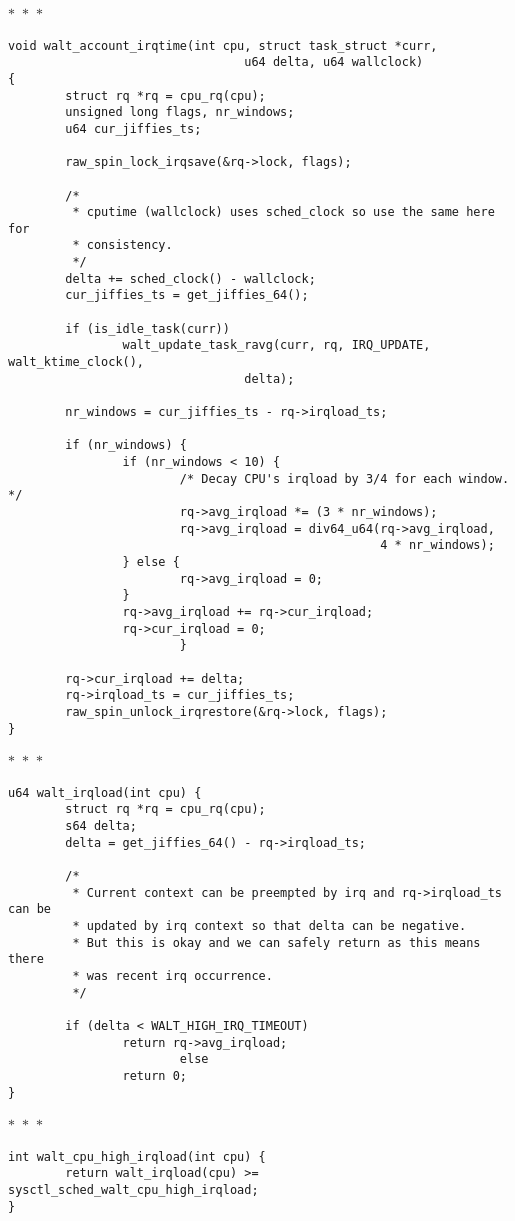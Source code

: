 \documentclass{article}
\newcommand{\divider}{{\begin{center}
  $\ast$~$\ast$~$\ast$
\end{center}}}
\begin{document}
\divider
\begin{verbatim}
void walt_account_irqtime(int cpu, struct task_struct *curr,
                                 u64 delta, u64 wallclock)
{
        struct rq *rq = cpu_rq(cpu);
        unsigned long flags, nr_windows;
        u64 cur_jiffies_ts;

        raw_spin_lock_irqsave(&rq->lock, flags);

        /*
         * cputime (wallclock) uses sched_clock so use the same here for
         * consistency.
         */
        delta += sched_clock() - wallclock;
        cur_jiffies_ts = get_jiffies_64();

        if (is_idle_task(curr))
                walt_update_task_ravg(curr, rq, IRQ_UPDATE, walt_ktime_clock(),
                                 delta);

        nr_windows = cur_jiffies_ts - rq->irqload_ts;
        
        if (nr_windows) {
                if (nr_windows < 10) {
                        /* Decay CPU's irqload by 3/4 for each window. */
                        rq->avg_irqload *= (3 * nr_windows);
                        rq->avg_irqload = div64_u64(rq->avg_irqload,
                                                    4 * nr_windows);
                } else {
                        rq->avg_irqload = 0;
                }
                rq->avg_irqload += rq->cur_irqload;
                rq->cur_irqload = 0;
                        }

        rq->cur_irqload += delta;
        rq->irqload_ts = cur_jiffies_ts;
        raw_spin_unlock_irqrestore(&rq->lock, flags);
}
\end{verbatim}
\divider
\begin{verbatim}
u64 walt_irqload(int cpu) {
        struct rq *rq = cpu_rq(cpu);
        s64 delta;
        delta = get_jiffies_64() - rq->irqload_ts;

        /*
         * Current context can be preempted by irq and rq->irqload_ts can be
         * updated by irq context so that delta can be negative.
         * But this is okay and we can safely return as this means there
         * was recent irq occurrence.
         */

        if (delta < WALT_HIGH_IRQ_TIMEOUT)
                return rq->avg_irqload;
                        else
                return 0;
}
\end{verbatim}
\divider
\begin{verbatim}
int walt_cpu_high_irqload(int cpu) {
        return walt_irqload(cpu) >= sysctl_sched_walt_cpu_high_irqload;
}
\end{verbatim}
\end{document}
